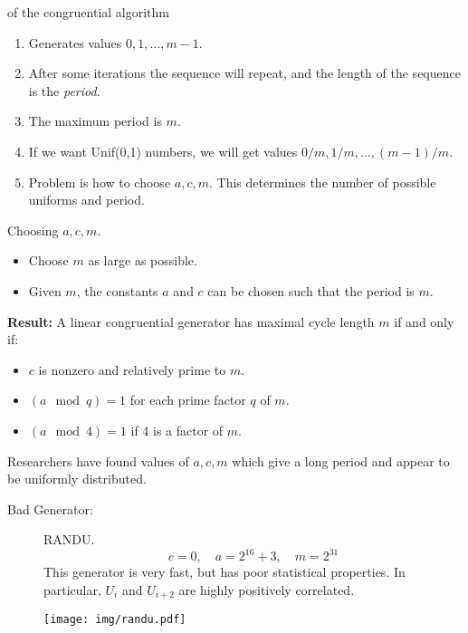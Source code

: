 \documentclass[11pt,english]{scrbook}
\begin{document}
\begin{description}
\item[{Properties:}] of the congruential algorithm
\begin{enumerate}
\item Generates values \(0,1,\ldots,m-1\).
\item After some iterations the sequence will repeat, and the length of the sequence is the \emph{period}.
\item The maximum period is \(m\).
\item If we want Unif(0,1) numbers, we will get values \(0/m,1/m,\ldots,(m-1)/m\).
\item Problem is how to choose \(a,c,m\). This determines the number of possible uniforms and period.
\end{enumerate}

\item[{NUMBER THEORY RESULTS:}] Choosing \(a,c,m\).  
\begin{itemize}
\item Choose \(m\) as large as possible.
\item Given \(m\), the constants \(a\) and \(c\) can be chosen such that the period is \(m\).
\end{itemize}

\item \textbf{Result:} A linear congruential generator has maximal cycle length \(m\) if and only if:
\begin{itemize}
\item \(c\) is nonzero and relatively prime to \(m\).
\item \((a\mod q) = 1\) for each prime factor \(q\) of \(m\).
\item \((a\mod 4) = 1\) if 4 is a factor of \(m\).
\end{itemize}
\end{description}

Researchers have found values of \(a,c,m\) which give a long period and appear to be uniformly distributed.

\begin{description}
\item[{Bad Generator:}] RANDU.  
\[
  c = 0,\quad a=2^{16}+3,\quad m=2^{31}
  \]
This generator is very fast, but has poor statistical properties. In particular, \(U_{i}\) and \(U_{i+2}\) are highly positively correlated.

\begin{center}
\begin{center}
\texttt{[image: img/randu.pdf]}
\end{center}

\end{center}
\end{description}
\end{document}
